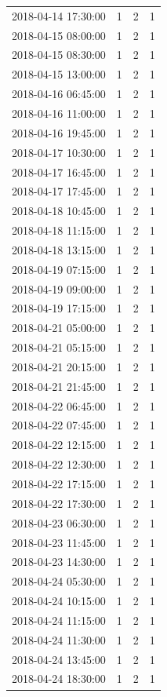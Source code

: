 \begin{tabular}{lrrr}
2018-04-14 17:30:00 & 1 & 2 & 1 \\
2018-04-15 08:00:00 & 1 & 2 & 1 \\
2018-04-15 08:30:00 & 1 & 2 & 1 \\
2018-04-15 13:00:00 & 1 & 2 & 1 \\
2018-04-16 06:45:00 & 1 & 2 & 1 \\
2018-04-16 11:00:00 & 1 & 2 & 1 \\
2018-04-16 19:45:00 & 1 & 2 & 1 \\
2018-04-17 10:30:00 & 1 & 2 & 1 \\
2018-04-17 16:45:00 & 1 & 2 & 1 \\
2018-04-17 17:45:00 & 1 & 2 & 1 \\
2018-04-18 10:45:00 & 1 & 2 & 1 \\
2018-04-18 11:15:00 & 1 & 2 & 1 \\
2018-04-18 13:15:00 & 1 & 2 & 1 \\
2018-04-19 07:15:00 & 1 & 2 & 1 \\
2018-04-19 09:00:00 & 1 & 2 & 1 \\
2018-04-19 17:15:00 & 1 & 2 & 1 \\
2018-04-21 05:00:00 & 1 & 2 & 1 \\
2018-04-21 05:15:00 & 1 & 2 & 1 \\
2018-04-21 20:15:00 & 1 & 2 & 1 \\
2018-04-21 21:45:00 & 1 & 2 & 1 \\
2018-04-22 06:45:00 & 1 & 2 & 1 \\
2018-04-22 07:45:00 & 1 & 2 & 1 \\
2018-04-22 12:15:00 & 1 & 2 & 1 \\
2018-04-22 12:30:00 & 1 & 2 & 1 \\
2018-04-22 17:15:00 & 1 & 2 & 1 \\
2018-04-22 17:30:00 & 1 & 2 & 1 \\
2018-04-23 06:30:00 & 1 & 2 & 1 \\
2018-04-23 11:45:00 & 1 & 2 & 1 \\
2018-04-23 14:30:00 & 1 & 2 & 1 \\
2018-04-24 05:30:00 & 1 & 2 & 1 \\
2018-04-24 10:15:00 & 1 & 2 & 1 \\
2018-04-24 11:15:00 & 1 & 2 & 1 \\
2018-04-24 11:30:00 & 1 & 2 & 1 \\
2018-04-24 13:45:00 & 1 & 2 & 1 \\
2018-04-24 18:30:00 & 1 & 2 & 1 \\

\end{tabular}
